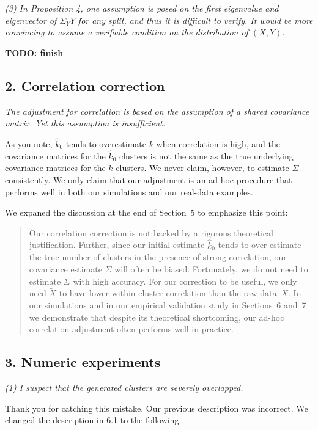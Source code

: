 \documentclass[11pt]{article}
\begin{document}
\emph{(3) In Proposition 4, one assumption is posed on the first eigenvalue
and eigenvector of $\Sigma_YY$ for any split, and thus it is difficult to
verify. It would be more convincing to assume a verifiable condition on the
distribution of $(X, Y)$.}

\textbf{TODO: finish}


\subsection{2. Correlation correction}

\emph{The adjustment for correlation is based on the assumption of a
shared covariance matrix. Yet this assumption is insufficient.}

As you note, $\hat{k}_0$ tends to overestimate $k$ when correlation is high,
and the covariance matrices for the  $\hat{k}_0$ clusters is not the same as
the true underlying covariance matrices for the $k$ clusters. We never claim,
however, to estimate $\Sigma$ consistently. We only claim that our adjustment
is an ad-hoc procedure that performs well in both our simulations and our
real-data examples.

We expaned the discussion at the end of Section~5 to emphasize this point:

\begin{quote}
Our correlation correction is not backed by a rigorous theoretical
justification. Further, since our initial estimate $\hat k_0$ tends to
over-estimate the true number of clusters in the presence of strong
correlation, our covariance estimate $\hat \Sigma$ will often be biased.
Fortunately, we do not need to estimate $\Sigma$ with high accuracy. For our
correction to be useful, we only need $\tilde{X}$ to have lower within-cluster
correlation than the raw data~$X$. In our simulations and in our empirical
validation study in Sections~6 and~7 we demonstrate that despite its
theoretical shortcoming, our ad-hoc correlation adjustment often performs well
in practice.
\end{quote}


\subsection{3. Numeric experiments}

\emph{(1) I suspect that the generated clusters are severely overlapped.}

Thank you for catching this mistake. Our previous description was
incorrect. We changed the description in 6.1 to the following:
\end{document}
